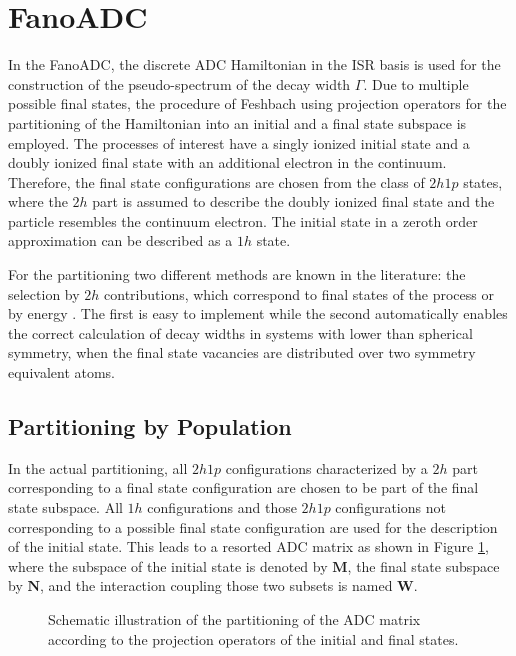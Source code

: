 \section{FanoADC}
In the FanoADC, the discrete ADC Hamiltonian in the \ac{ISR}
basis is used for the construction of the pseudo-spectrum of the decay width
$\Gamma$.
Due to multiple possible final states, the procedure
of Feshbach using projection operators for the partitioning of the Hamiltonian
into an initial and a final state subspace is employed.
The processes of interest have a singly ionized initial state and a
doubly ionized final state with an additional electron in the continuum.
Therefore, the final state configurations are chosen from
the class of $2h1p$ states, where the $2h$ part is assumed to
describe the doubly ionized final state and the particle resembles the continuum electron.
The initial state in a zeroth order approximation can be described as a $1h$ state.

For the partitioning two different methods are known in the literature:
the selection by $2h$ contributions, which correspond to final states of
the process or by energy \cite{Averbukh05}.
The first is easy to implement while the second automatically
enables the correct calculation of decay widths in systems with lower than
spherical symmetry, when the final state vacancies are distributed over two symmetry
equivalent atoms.


\subsection{Partitioning by Population}
In the actual partitioning, all $2h1p$ configurations characterized by a $2h$
part corresponding to
a final state configuration are chosen to be part of the final state subspace.
All $1h$ configurations and those $2h1p$ configurations not corresponding
to a possible final state configuration are used for the description
of the initial state. This leads to a resorted \ac{ADC} matrix as shown in
Figure \ref{figure:fano_matsort}, where the subspace of the initial state
is denoted by $\mathbf{M}$, the final state subspace by $\mathbf{N}$, and
the interaction coupling those two subsets is named $\mathbf{W}$.

\begin{figure}[h]
  \centering
  
  \caption{Schematic illustration of the partitioning of the \ac{ADC} matrix
           according to the projection operators of the initial and final
           states.}
  \label{figure:fano_matsort}
\end{figure}

